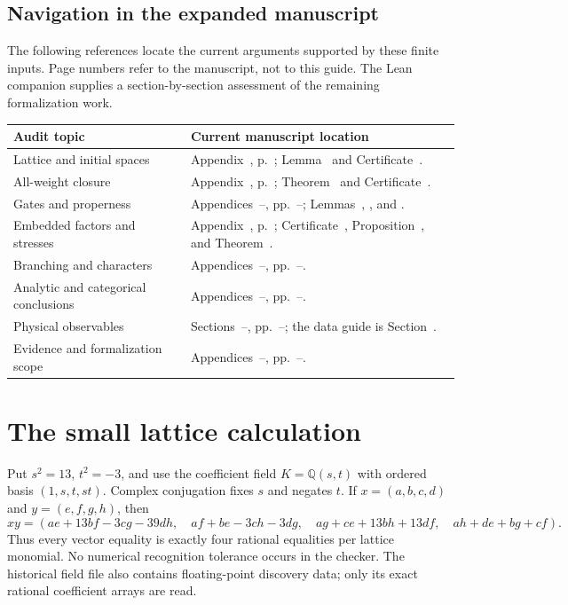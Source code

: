 \documentclass[11pt]{article}
\newcommand{\QQ}{\mathbb Q}\newcommand{\CC}{\mathbb C}\newcommand{\ZZ}{\mathbb Z}
\theoremstyle{remark}\newtheorem{remark}[proposition]{Remark}
\begin{document}
\subsection{Navigation in the expanded manuscript}
The following references locate the current arguments supported by
these finite inputs. Page numbers refer to the manuscript, not to this
guide. The Lean companion supplies a section-by-section assessment of
the remaining formalization work.
\begin{longtable}{@{}P{.28\linewidth}P{.60\linewidth}@{}}
\toprule Audit topic & Current manuscript location\\\midrule
\endhead
Lattice and initial spaces & Appendix~,
p.~; Lemma~ and
Certificate~.\\
All-weight closure & Appendix~,
p.~; Theorem~ and
Certificate~.\\
Gates and properness & Appendices~--,
pp.~--;
Lemmas~, , and .\\
Embedded factors and stresses & Appendix~,
p.~; Certificate~,
Proposition~, and
Theorem~.\\
Branching and characters & Appendices~--,
pp.~--.\\
Analytic and categorical conclusions & Appendices~--,
pp.~--.\\
Physical observables & Sections~--,
pp.~--;
the data guide is Section~.\\
Evidence and formalization scope & Appendices~--,
pp.~--.\\
\bottomrule
\end{longtable}

\section{The small lattice calculation}
Put $s^2=13$, $t^2=-3$, and use the coefficient field
$K=\QQ(s,t)$ with ordered basis $(1,s,t,st)$. Complex conjugation fixes
$s$ and negates $t$. If $x=(a,b,c,d)$ and $y=(e,f,g,h)$, then
\[
xy=(ae+13bf-3cg-39dh,\quad af+be-3ch-3dg,
\quad ag+ce+13bh+13df,\quad ah+de+bg+cf).
\]
Thus every vector equality is exactly four rational equalities per
lattice monomial. No numerical recognition tolerance occurs in the
checker. The historical field file also contains floating-point discovery
data; only its exact rational coefficient arrays are read.
\end{document}
